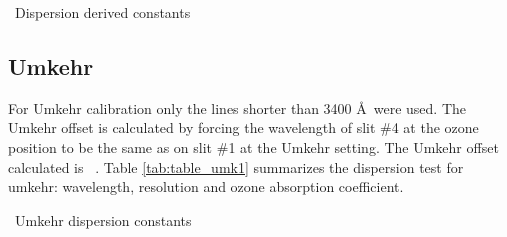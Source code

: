 \begin{table} 
\centering
		\caption{\calyear\ Dispersion derived constants}
		\label{tab:table_QDETAIL1}
		
\end{table}


\clearpage
\subsection{Umkehr}
For Umkehr calibration only the lines shorter than 3400 \AA\ were used.
The Umkehr offset is calculated by forcing the wavelength of slit \#4 at the ozone position to be the same as on slit \#1 at the Umkehr setting. The Umkehr offset calculated is \textbf{\UMKoffsetnew}\ . 
Table \ref{tab:table_umk1} summarizes the dispersion test for umkehr: wavelength, resolution and ozone absorption coefficient.
\vspace{1cm}
%		

\begin{table}[htbp!] \centering
		\caption{\calyear\ Umkehr dispersion constants}
		\label{tab:table_umk1}
		
\end{table}



